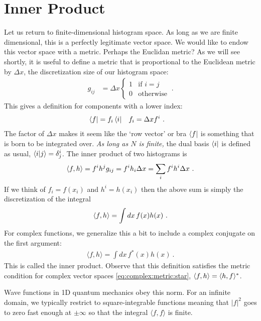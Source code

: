 \documentclass[12pt, oneside]{report}    %
\let\oldsection\section
\def\section{%
  \setcounter{sidenote}{1}%
  \oldsection
}
\begin{document}
\section{Inner Product}

Let us return to finite-dimensional histogram space. As long as we are finite dimensional, this is a perfectly legitimate vector space. We would like to endow this vector space with a metric. Perhaps the Euclidan metric? As we will see shortly, it is useful to define a metric that is proportional to the Euclidean metric by $\Delta x$, the discretization size of our histogram space:
\begin{align}
    g_{ij} &=
    \Delta x 
    \begin{cases}
    1 & \text{if } i=j \\
    0 & \text{otherwise}
    \end{cases}
    \ .
    \label{eq:metric:on:histogram:space}
\end{align}
This gives a definition for components with a lower index:
\begin{align}
    \left\langle f\right| &= f_i\left\langle i\right| & f_i &= \Delta x f^i \ .
    \label{eqref:histogram:row:vec}
\end{align}
The factor of $\Delta x$ makes it seem like the `row vector' or bra $\left\langle f\right|$ is something that is born to be integrated over. \emph{As long as $N$ is finite,} the dual basis $\left\langle i\right|$ is defined as usual, $\langle i | j \rangle = \delta^i_j$. The inner product of two histograms is
\begin{align}
    \langle f , h \rangle = f^i h^j g_{ij} = f^i h_i \Delta x = \sum_i f^i h^i \Delta x \ .
    \label{eq:metric:on:histogram:space:bracket:form}
\end{align}
If we think of $f_i = f(x_i)$ and $h^i=h(x_i)$ then the above sum is simply the discretization of the integral
\begin{align}
    \langle f , h \rangle = \int dx\, f(x)h(x) \ .
\end{align}
For complex functions, we generalize this a bit to include a complex conjugate on the first argument:
\begin{align}
  \langle f,h\rangle 
  =
  \int dx\, f^*(x)h(x) \ .
  \label{eq:L2:inner:product}
\end{align}
This is called the  inner product. Observe that this definition satisfies the metric condition for complex vector spaces \eqref{eq:complex:metric:star}, $\langle f, h\rangle = \langle h, f \rangle^* $.
\begin{example}
Wave functions in 1D quantum mechanics obey this norm. For an infinite domain, we typically restrict to square-integrable functions meaning that $|f|^2$ goes to zero fast enough at $\pm \infty$ so that the integral $\langle f, f\rangle$ is finite. 
\end{example}
\end{document}
